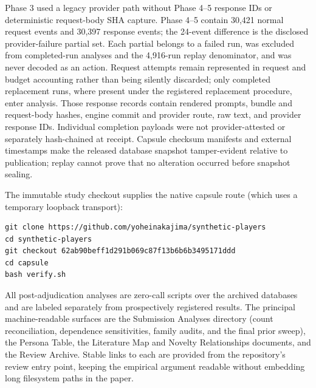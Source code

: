 \documentclass[11pt]{article}
\begin{document}
Phase 3 used a legacy provider path without Phase 4--5 response IDs or
deterministic request-body SHA capture. Phase 4--5 contain 30,421 normal
request events and 30,397 response events; the 24-event difference is
the disclosed provider-failure partial set. Each partial belongs to a
failed run, was excluded from completed-run analyses and the 4,916-run
replay denominator, and was never decoded as an action. Request attempts
remain represented in request and budget accounting rather than being
silently discarded; only completed replacement runs, where present under
the registered replacement procedure, enter analysis. Those response
records contain rendered prompts, bundle and request-body hashes, engine
commit and provider route, raw text, and provider response IDs.
Individual completion payloads were not provider-attested or separately
hash-chained at receipt. Capsule checksum manifests and external
timestamps make the released database snapshot tamper-evident relative
to publication; replay cannot prove that no alteration occurred before
snapshot sealing.

The immutable study checkout supplies the native capsule route (which
uses a temporary loopback transport):

\begin{verbatim}
git clone https://github.com/yoheinakajima/synthetic-players
cd synthetic-players
git checkout 62ab90beff1d291b069c87f13b6b6b3495171ddd
cd capsule
bash verify.sh
\end{verbatim}

All post-adjudication analyses are zero-call scripts over the archived
databases and are labeled separately from prospectively registered
results. The principal machine-readable surfaces are the Submission
Analyses directory (count reconciliation, dependence sensitivities,
family audits, and the final prior sweep), the Persona Table, the
Literature Map and Novelty Relationships documents, and the Review
Archive. Stable links to each are provided from the repository's review
entry point, keeping the empirical argument readable without embedding
long filesystem paths in the paper.
\end{document}
